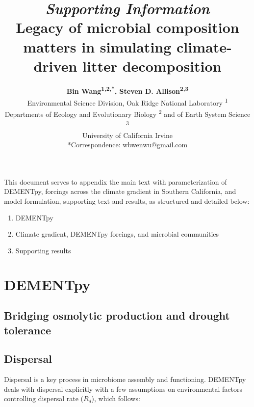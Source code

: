 \documentclass[letterpaper, 10pt]{article}
\begin{document}
\setlength{\droptitle}{-8em} 
\title{\Large\textbf{\textit{Supporting Information}\vspace{1em} \\
Legacy of microbial composition matters in simulating climate-driven litter decomposition}\vspace{-0em}}
\author{\normalsize\textbf{Bin Wang\textsuperscript{1,2,*}, Steven D. Allison\textsuperscript{2,3}}
\vspace{1em}\\
Environmental Science Division, Oak Ridge National Laboratory \textsuperscript{1} \\
Departments of Ecology and Evolutionary Biology \textsuperscript{2} 
and of Earth System Science \textsuperscript{3}\\
University of California Irvine\vspace{1em} \\
*Correspondence: wbwenwu@gmail.com} 
\maketitle

This document serves to appendix the main text with parameterization of DEMENTpy, forcings across
the climate gradient in Southern California, and model formulation, supporting text and results, as structured
and detailed below:
\begin{enumerate}
\item DEMENTpy
\item Climate gradient, DEMENTpy forcings, and microbial communities
\item Supporting results
\end{enumerate}

\section{DEMENTpy}
\subsection{Bridging osmolytic production and drought tolerance}

\subsection{Dispersal}
Dispersal is a key process in microbiome assembly and functioning. DEMENTpy deals with
 dispersal explicitly with a few assumptions on environmental factors controlling 
 dispersal rate ($R_{d}$), which follows:
\end{document}
